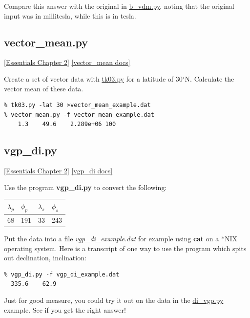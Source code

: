 \documentclass[11pt]{book}
\begin{document}
{Compare this answer with the original in \href{#b_vdm.py}{b\_vdm.py}, noting that the original input was in millitesla, while this is in tesla.




\subsection{vector\_mean.py}
\href{http://earthref.org/MAGIC/books/Tauxe/Essentials/WebBook3ch2.html#ch2}{[Essentials Chapter 2]}
\href{https://github.com/PmagPy/PmagPy/blob/master/programs/vector_mean.py}{[vector\_mean docs]}

Create a set of vector data with \href{#tk03.py}{tk03.py} for a latitude of 30$^{\circ}$N.  Calculate the vector mean of these data.

\begin{verbatim}
% tk03.py -lat 30 >vector_mean_example.dat
% vector_mean.py -f vector_mean_example.dat
    1.3    49.6    2.289e+06 100
\end{verbatim}


\subsection{vgp\_di.py}
\href{http://earthref.org/MAGIC/books/Tauxe/Essentials/WebBook3ch2.html#ch2}{[Essentials Chapter 2]}
\href{https://github.com/PmagPy/PmagPy/blob/master/programs/vgp_di.py}{[vgp\_di docs]}

Use the program {\bf vgp\_di.py} to convert the
following:


\begin{tabular}{llll}
\hline
$\lambda_p$\qquad &$\phi_p$ \qquad & $\lambda_s$\qquad & $\phi_s$ \\
\hline
68 \qquad & 191 \qquad & 33 \qquad & 243\\
\hline
\end{tabular}

 Put the data into a file {\it vgp\_di\_example.dat} for example using {\bf cat} on a *NIX operating system.
Here is a transcript of one way to use the program which spits out declination, inclination:

\begin{verbatim}
% vgp_di.py -f vgp_di_example.dat
  335.6    62.9
\end{verbatim}

Just for good measure, you could try it out on the data in the \href{#di_vgp.py}{di\_vgp.py} example.  See if you get the right answer!

}
\end{document}
